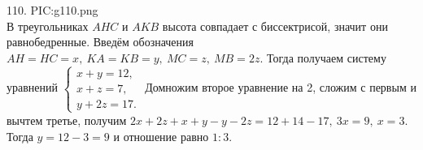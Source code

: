 110. {{PIC:g110.png}}\\
В треугольниках $AHC$ и $AKB$ высота совпадает с биссектрисой, значит они равнобедренные. Введём обозначения $AH=HC=x,\ KA=KB=y,\ MC=z,\ MB=2z.$ Тогда получаем систему уравнений $\begin{cases} x+y=12,\\ x+z=7,\\ y+2z=17.\end{cases}$ Домножим второе уравнение на 2, сложим с первым и вычтем третье, получим $2x+2z+x+y-y-2z=12+14-17,\ 3x=9,\ x=3.$ Тогда $y=12-3=9$ и отношение равно $1:3.$\newpage\noindent
